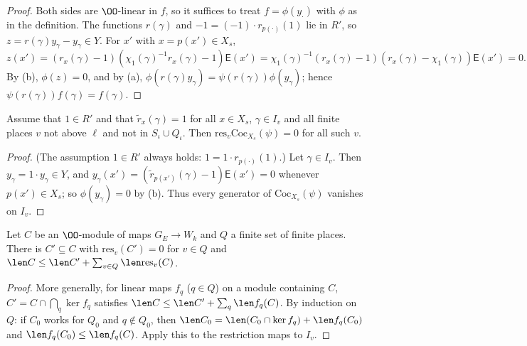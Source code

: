 \begin{proof}
Both sides are $\OO$-linear in $f$, so it suffices to treat $f=\phi(y_\cdot)$ with $\phi$ as in the definition. The functions $r(\gamma)$ and
$-1=(-1)\cdot r_{p(\cdot)}(1)$ lie in $R'$, so $z=r(\gamma)y_\gamma-y_\gamma\in Y$. For $x'$ with $x=p(x')\in X_s$,
\[
z(x')=(r_x(\gamma)-1)(\chi_1(\gamma)^{-1}r_x(\gamma)-1)\mathsf E(x')=\chi_1(\gamma)^{-1}(r_x(\gamma)-1)(r_x(\gamma)-\chi_1(\gamma))\mathsf E(x')=0 .
\]
By (b), $\phi(z)=0$, and by (a), $\phi(r(\gamma)y_\gamma)=\psi(r(\gamma))\phi(y_\gamma)$; hence $\psi(r(\gamma))f(\gamma)=f(\gamma)$.
\end{proof}

\begin{lemma}\label{pf:linkN:lgsel}
Assume that $1\in R'$ and that $\tilde r_x(\gamma)=1$ for all $x\in X_s$, $\gamma\in I_v$ and all finite places $v$ not above $\ell$ and not in
$S_\iota\cup Q_\iota$. Then $\mathrm{res}_v\mathrm{Coc}_{X_s}(\psi)=0$ for all such $v$.
\end{lemma}

\begin{proof}
(The assumption $1\in R'$ always holds: $1=1\cdot r_{p(\cdot)}(1)$.) Let $\gamma\in I_v$. Then $y_\gamma=1\cdot y_\gamma\in Y$, and
$y_\gamma(x')=(\tilde r_{p(x')}(\gamma)-1)\mathsf E(x')=0$ whenever $p(x')\in X_s$; so $\phi(y_\gamma)=0$ by (b). Thus every generator of
$\mathrm{Coc}_{X_s}(\psi)$ vanishes on $I_v$.
\end{proof}

\begin{lemma}[Peeling]\label{pf:linkN:peel}
Let $C$ be an $\OO$-module of maps $G_E\to W_k$ and $Q$ a finite set of finite places. There is $C'\subseteq C$ with $\mathrm{res}_v(C')=0$ for
$v\in Q$ and $\len C\le\len C'+\sum_{v\in Q}\len\mathrm{res}_v(C)$.
\end{lemma}

\begin{proof}
More generally, for linear maps $f_q$ ($q\in Q$) on a module containing $C$, $C'=C\cap\bigcap_q\ker f_q$ satisfies
$\len C\le\len C'+\sum_q\len f_q(C)$. By induction on $Q$: if $C_0$ works for $Q_0$ and $q\notin Q_0$, then
$\len C_0=\len(C_0\cap\ker f_q)+\len f_q(C_0)$ and $\len f_q(C_0)\le\len f_q(C)$. Apply this to the restriction maps to $I_v$.
\end{proof}

